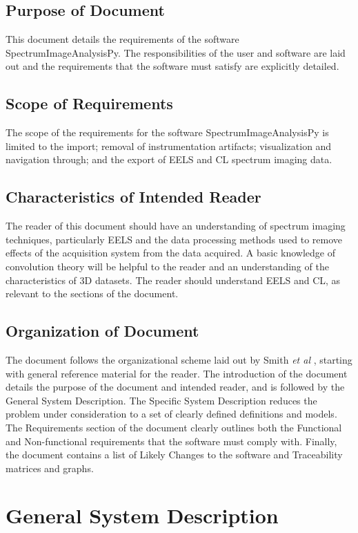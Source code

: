 \documentclass[12pt]{article}
\newcommand{\progname}{SpectrumImageAnalysisPy} %
\begin{document}
\subsection{Purpose of Document}

This document details the requirements of the software \progname{}. The responsibilities of the user and software are laid out and the requirements that the software must satisfy are explicitly detailed.

\subsection{Scope of Requirements} 
The scope of the requirements for the software \progname{} is limited to the import; removal of instrumentation artifacts; visualization and navigation through; and the export of EELS and CL spectrum imaging data.

\subsection{Characteristics of Intended Reader} 
The reader of this document should have an understanding of spectrum imaging techniques, particularly EELS and the data processing methods used to remove effects of the acquisition system from the data acquired. A basic knowledge of convolution theory will be helpful to the reader and an understanding of the characteristics of 3D datasets. The reader should understand EELS and CL, as relevant to the sections of the document.

\subsection{Organization of Document}

The document follows the organizational scheme laid out by Smith \textit{et al} \cite{SmithAndLai2005, smith_requirements_2007}, starting with general reference material for the reader. The introduction of the document details the purpose of the document and intended reader, and is followed by the General System Description. The Specific System Description reduces the problem under consideration to a set of clearly defined definitions and models. The Requirements section of the document clearly outlines both the Functional and Non-functional requirements that the software must comply with. Finally, the document contains a list of Likely Changes to the software and Traceability matrices and graphs.

\section{General System Description}
\end{document}
